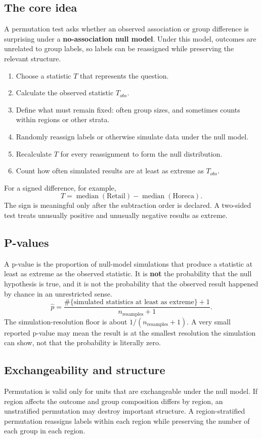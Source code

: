 \documentclass[11pt]{article}
\begin{document}
\subsection{The core idea}
A permutation test asks whether an observed association or group difference is surprising under a \textbf{no-association null model}. Under this model, outcomes are unrelated to group labels, so labels can be reassigned while preserving the relevant structure.
\begin{enumerate}
	\item Choose a statistic $T$ that represents the question.
	\item Calculate the observed statistic $T_{obs}$.
	\item Define what must remain fixed: often group sizes, and sometimes counts within regions or other strata.
	\item Randomly reassign labels or otherwise simulate data under the null model.
	\item Recalculate $T$ for every reassignment to form the null distribution.
	\item Count how often simulated results are at least as extreme as $T_{obs}$.
\end{enumerate}
For a signed difference, for example,
\[
T = \operatorname{median}(\text{Retail}) - \operatorname{median}(\text{Horeca}).
\]
The sign is meaningful only after the subtraction order is declared. A two-sided test treats unusually positive and unusually negative results as extreme.

\subsection{P-values}
A p-value is the proportion of null-model simulations that produce a statistic at least as extreme as the observed statistic. It is \textbf{not} the probability that the null hypothesis is true, and it is not the probability that the observed result happened by chance in an unrestricted sense.
\[
\hat p = \frac{\#\{\text{simulated statistics at least as extreme}\}+1}{n_{\text{resamples}}+1}.
\]
The simulation-resolution floor is about $1/(n_{\text{resamples}}+1)$. A very small reported p-value may mean the result is at the smallest resolution the simulation can show, not that the probability is literally zero.

\subsection{Exchangeability and structure}
Permutation is valid only for units that are exchangeable under the null model. If region affects the outcome and group composition differs by region, an unstratified permutation may destroy important structure. A region-stratified permutation reassigns labels within each region while preserving the number of each group in each region.
\end{document}
